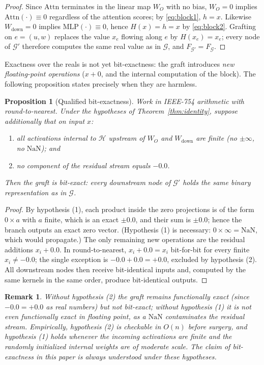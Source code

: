 \documentclass[11pt,a4paper]{article}
\newtheorem{proposition}{Proposition}
\newtheorem{remark}{Remark}
\newcommand{\G}{\mathcal{G}}
\newcommand{\Gp}{\mathcal{G}'}
\newcommand{\Hb}{\mathcal{H}}
\begin{document}
\begin{proof}
Since $\mathrm{Attn}$ terminates in the linear map $W_O$ with no bias, $W_O = 0$ implies $\mathrm{Attn}(\cdot) \equiv 0$ regardless of the attention scores; by \eqref{eq:block1}, $h = x$. Likewise $W_{\mathrm{down}} = 0$ implies $\mathrm{MLP}(\cdot) \equiv 0$, hence $H(x) = h = x$ by \eqref{eq:block2}. Grafting on $e = (u,w)$ replaces the value $x_e$ flowing along $e$ by $H(x_e) = x_e$; every node of $\Gp$ therefore computes the same real value as in $\G$, and $F_{\Gp} = F_{\G}$.
\end{proof}

Exactness over the reals is not yet bit-exactness: the graft introduces \emph{new floating-point operations} ($x + 0$, and the internal computation of the block). The following proposition states precisely when they are harmless.

\begin{proposition}[Qualified bit-exactness]
\label{prop:bitexact}
Work in IEEE-754 arithmetic with round-to-nearest. Under the hypotheses of Theorem~\ref{thm:identity}, suppose additionally that on input $x$:
\begin{enumerate}
    \item all activations internal to $\Hb$ upstream of $W_O$ and $W_{\mathrm{down}}$ are finite (no $\pm\infty$, no $\mathrm{NaN}$); and
    \item no component of the residual stream equals $-0.0$.
\end{enumerate}
Then the graft is bit-exact: every downstream node of $\Gp$ holds the same binary representation as in $\G$.
\end{proposition}

\begin{proof}
By hypothesis (1), each product inside the zero projections is of the form $0 \times a$ with $a$ finite, which is an exact $\pm 0.0$, and their sum is $\pm 0.0$; hence the branch outputs an exact zero vector. (Hypothesis (1) is necessary: $0 \times \infty = \mathrm{NaN}$, which would propagate.) The only remaining new operations are the residual additions $x_i + 0.0$. In round-to-nearest, $x_i + 0.0 = x_i$ bit-for-bit for every finite $x_i \neq -0.0$; the single exception is $-0.0 + 0.0 = +0.0$, excluded by hypothesis (2). All downstream nodes then receive bit-identical inputs and, computed by the same kernels in the same order, produce bit-identical outputs.
\end{proof}

\begin{remark}
Without hypothesis (2) the graft remains functionally exact (since $-0.0 = +0.0$ as real numbers) but not bit-exact; without hypothesis (1) it is not even functionally exact in floating point, as a $\mathrm{NaN}$ contaminates the residual stream. Empirically, hypothesis (2) is checkable in $O(n)$ before surgery, and hypothesis (1) holds whenever the incoming activations are finite and the randomly initialized internal weights are of moderate scale. The claim of bit-exactness in this paper is always understood under these hypotheses.
\end{remark}
\end{document}
